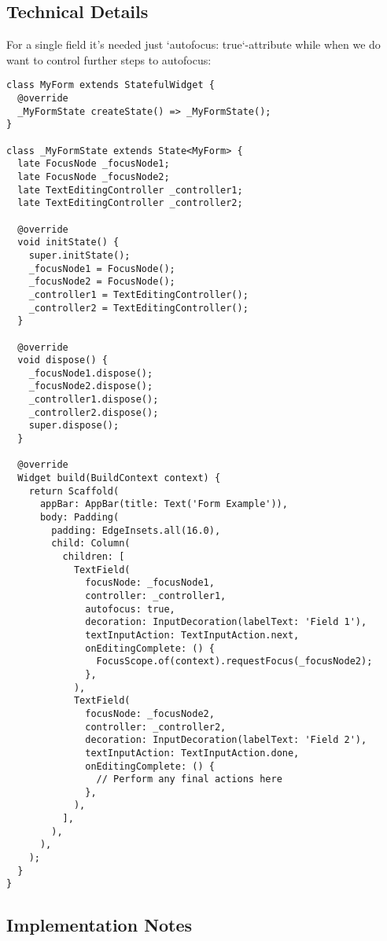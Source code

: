 \subsection{Technical Details}

For a single field it's needed just `autofocus: true`-attribute while when we do want to control 
further steps to autofocus:

\begin{lstlisting}
class MyForm extends StatefulWidget {
  @override
  _MyFormState createState() => _MyFormState();
}

class _MyFormState extends State<MyForm> {
  late FocusNode _focusNode1;
  late FocusNode _focusNode2;
  late TextEditingController _controller1;
  late TextEditingController _controller2;

  @override
  void initState() {
    super.initState();
    _focusNode1 = FocusNode();
    _focusNode2 = FocusNode();
    _controller1 = TextEditingController();
    _controller2 = TextEditingController();
  }

  @override
  void dispose() {
    _focusNode1.dispose();
    _focusNode2.dispose();
    _controller1.dispose();
    _controller2.dispose();
    super.dispose();
  }

  @override
  Widget build(BuildContext context) {
    return Scaffold(
      appBar: AppBar(title: Text('Form Example')),
      body: Padding(
        padding: EdgeInsets.all(16.0),
        child: Column(
          children: [
            TextField(
              focusNode: _focusNode1,
              controller: _controller1,
              autofocus: true,
              decoration: InputDecoration(labelText: 'Field 1'),
              textInputAction: TextInputAction.next,
              onEditingComplete: () {
                FocusScope.of(context).requestFocus(_focusNode2);
              },
            ),
            TextField(
              focusNode: _focusNode2,
              controller: _controller2,
              decoration: InputDecoration(labelText: 'Field 2'),
              textInputAction: TextInputAction.done,
              onEditingComplete: () {
                // Perform any final actions here
              },
            ),
          ],
        ),
      ),
    );
  }
}
\end{lstlisting}

\subsection{Implementation Notes}

